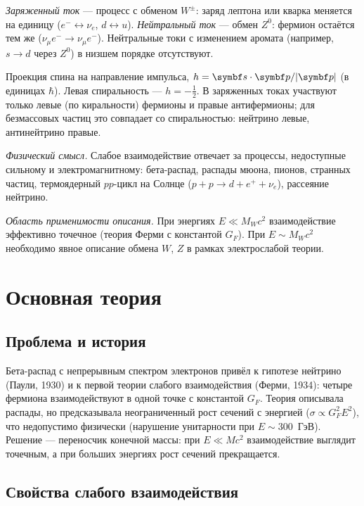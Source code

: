 \begin{definition}
\emph{Заряженный ток} — процесс с обменом $W^\pm$: заряд лептона или кварка меняется на единицу ($e^-\leftrightarrow\nu_e$,
$d\leftrightarrow u$). \emph{Нейтральный ток} — обмен $Z^0$: фермион остаётся тем же ($\nu_\mu e^-\to\nu_\mu e^-$).
Нейтральные токи с изменением аромата (например, $s\to d$ через $Z^0$) в низшем порядке отсутствуют.
\end{definition}

\begin{definition}[спиральность]
Проекция спина на направление импульса, $h=\vect s\cdot\vect p/|\vect p|$ (в единицах $\hbar$). Левая спиральность — $h=-\frac12$.
В заряженных токах участвуют только левые (по киральности) фермионы и правые антифермионы; для безмассовых
частиц это совпадает со спиральностью: нейтрино левые, антинейтрино правые.
\end{definition}

\emph{Физический смысл.} Слабое взаимодействие отвечает за процессы, недоступные сильному и
электромагнитному: бета-распад, распады мюона, пионов, странных частиц, термоядерный $pp$-цикл на Солнце
($p+p\to d+e^++\nu_e$), рассеяние нейтрино.

\emph{Область применимости описания.} При энергиях $E\ll M_Wc^2$ взаимодействие эффективно точечное (теория
Ферми с константой $G_F$). При $E\sim M_Wc^2$ необходимо явное описание обмена $W$, $Z$ в рамках электрослабой теории.

\section{Основная теория}

\subsection{Проблема и история}

Бета-распад с непрерывным спектром электронов привёл к гипотезе нейтрино (Паули, 1930) и к первой теории
слабого взаимодействия (Ферми, 1934): четыре фермиона взаимодействуют в одной точке с константой
$G_F$. Теория описывала распады, но предсказывала неограниченный рост сечений с энергией ($\sigma\propto G_F^2E^2$),
что недопустимо физически (нарушение унитарности при $E\sim300$~ГэВ). Решение — переносчик конечной массы:
при $E\ll Mc^2$ взаимодействие выглядит точечным, а при больших энергиях рост сечений прекращается.

\subsection{Свойства слабого взаимодействия}

